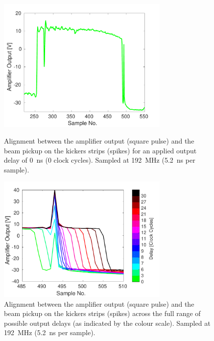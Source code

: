 \begin{figure}
  \centering
  \includegraphics[width=0.75\textwidth]{Figures/commissioning/absDelay0_all}
  \caption{Alignment between the amplifier output (square pulse) and the beam pickup on the kickers strips (spikes) for an applied output delay of 0~ns (0 clock cycles). Sampled at 192~MHz (5.2~ns per sample).}
  \label{f:absDelay0_all}
  \includegraphics[width=0.75\textwidth]{Figures/commissioning/absDelayAll_endPulse}
  \caption{Alignment between the amplifier output (square pulse) and the beam pickup on the kickers strips (spikes) across the full range of possible output delays (as indicated by the colour scale). Sampled at 192~MHz (5.2~ns per sample).}
  \label{f:absDelayAll_endPulse}
\end{figure}

